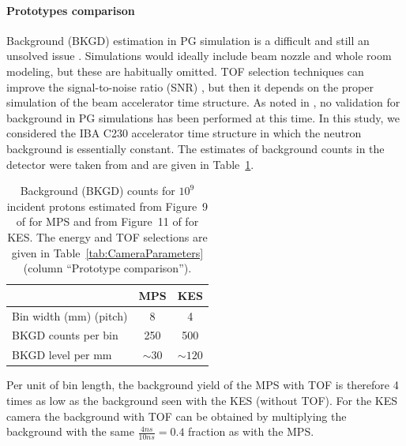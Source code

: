 \documentclass[a4paper,english,12pt]{article}
\newcommand{\qq}[1]{\enquote{#1}}
\begin{document}
\paragraph{Prototypes comparison}

Background (BKGD) estimation in PG simulation is a difficult and still an unsolved issue \citep{Huisman2016,Sterpin2015,Pinto2014a,Perali2014}. Simulations would ideally include beam nozzle and whole room modeling, but these are habitually omitted. TOF selection techniques can improve the signal-to-noise ratio (SNR) \citep{Testa2008,Roellinghoff2014a}, but then it depends on the proper simulation of the beam accelerator time structure. As noted in \cite{Huisman2016}, no validation for background in PG simulations has been performed at this time. In this study, we considered the IBA C230 accelerator time structure in which the neutron background is essentially constant. The estimates of background counts in the detector were taken from \cite{Pinto2014a,Perali2014} and are given in Table~\ref{tab:BKGD}.

\begin{table}[h]
\centering
\begin{tabular}{lcc}
	\toprule
		& MPS			& KES \\
	\midrule
	Bin width (mm) (pitch)	& 8				& 4 \\
	BKGD counts per bin			& 250			& 500 \\
	BKGD level per mm				& $\sim30$& $\sim120$ \\
	\bottomrule
\end{tabular}
\caption{Background (BKGD) counts for $10^9$ incident protons estimated from Figure~9 of \cite{Pinto2014a} for MPS and from Figure~11 of \cite{Perali2014} for KES. The energy and TOF selections are given in Table~\ref{tab:CameraParameters} (column \qq{Prototype comparison}).}
\label{tab:BKGD}
\end{table}


Per unit of bin length, the background yield of the MPS with TOF is therefore 4 times as low as the background seen with the KES (without TOF). For the KES camera the background with TOF can be obtained by multiplying the background with the same $\frac{4 ns}{10 ns} = 0.4$ fraction as with the MPS.
\end{document}
